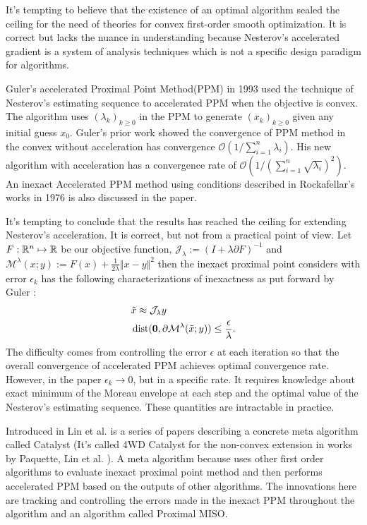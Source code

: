 \documentclass[12pt]{article}
\begin{document}
    It's tempting to believe that the existence of an optimal algorithm sealed the ceiling for the need of theories for convex first-order smooth optimization. 
    It is correct but lacks the nuance in understanding because Nesterov's accelerated gradient is a system of analysis techniques which is not a specific design paradigm for algorithms. 
    
    Guler's accelerated Proximal Point Method(PPM) \cite{guler_new_1992} in 1993 used the technique of Nesterov's estimating sequence to accelerated PPM when the objective is convex. 
    The algorithm uses $(\lambda_k)_{k \ge 0}$ in the PPM to generate $(x_k)_{k\ge 0}$ given any initial guess $x_0$.
    Guler's prior work \cite{guler_convergence_1991} showed the convergence of PPM method in the convex without acceleration has convergence $\mathcal O\left(1/\sum^{n}_{i = 1}\lambda_i\right)$. 
    His new algorithm with acceleration has a convergence rate of $\mathcal O\left(1/(\sum_{i = 1}^{n} \sqrt{\lambda_i})^2\right)$. 
    An inexact Accelerated PPM method using conditions described in Rockafellar's works in 1976 \cite{rockafellar_monotone_1976} is also discussed in the paper. 

    It's tempting to conclude that the results has reached the ceiling for extending Nesterov's acceleration. 
    It is correct, but not from a practical point of view. 
    Let $F: \mathbb R^n \mapsto \mathbb R$ be our objective function, $\mathcal J_\lambda := (I + \lambda \partial F)^{-1}$ and $\mathcal M^{\lambda}(x; y):= F(x) + \frac{1}{2\lambda}\Vert x - y\Vert^2$ then the inexact proximal point considers with error $\epsilon_k$ has the following characterizations of inexactness as put forward by Guler \cite{guler_new_1992}: 
    \begin{align*}
        & \tilde x \approx \mathcal J_\lambda y
        \\
        & 
        \operatorname{dist}(\mathbf 0, \partial\mathcal{M}^{\lambda}(\tilde x; y))
        \le \frac{\epsilon}{\lambda}. 
    \end{align*}
    The difficulty comes from controlling the error $\epsilon$ at each iteration so that the overall convergence of accelerated PPM achieves optimal convergence rate. 
    However, in the paper $\epsilon_k \rightarrow 0$, but in a specific rate. 
    It requires knowledge about exact minimum of the Moreau envelope at each step and the optimal value of the Nesterov's estimating sequence. 
    These quantities are intractable in practice. 

    Introduced in Lin et al. \cite{lin_universal_2015}\cite{lin_catalyst_2018} is a series of papers describing a concrete meta algorithm called Catalyst (It's called 4WD Catalyst for the non-convex extension in works by Paquette, Lin et al. \cite{paquette_catalyst_2018}). 
    A meta algorithm because uses other first order algorithms to evaluate inexact proximal point method and then performs accelerated PPM based on the outputs of other algorithms. 
    The innovations here are tracking and controlling the errors made in the inexact PPM throughout the algorithm and an algorithm called Proximal MISO. 
\end{document}
